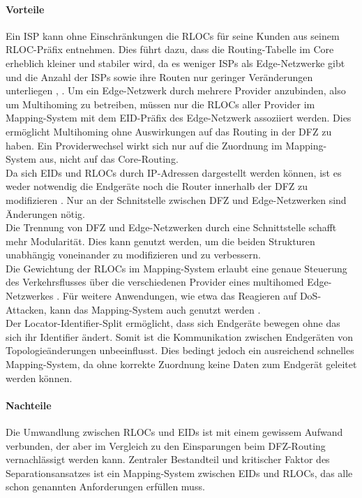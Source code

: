\paragraph{Vorteile}
Ein ISP kann ohne Einschränkungen die RLOCs für seine Kunden aus seinem RLOC-Präfix entnehmen. Dies führt dazu, dass die Routing-Tabelle im Core erheblich kleiner und stabiler wird, da es weniger ISPs als Edge-Netzwerke gibt und die Anzahl der ISPs sowie ihre Routen nur geringer Veränderungen unterliegen \cite{jen:2008:start}, \cite{deering:1996:map}.
Um ein Edge-Netzwerk durch mehrere Provider anzubinden, also um Multihoming zu betreiben, müssen nur die RLOCs aller Provider im Mapping-System mit dem EID-Präfix des Edge-Netzwerk assoziiert werden\cite{farinacci:2009:LISP}. Dies ermöglicht Multihoming ohne Auswirkungen auf das Routing in der DFZ zu haben. Ein Providerwechsel wirkt sich nur auf die Zuordnung im  Mapping-System aus, nicht auf das Core-Routing. \\
Da sich EIDs und RLOCs durch IP-Adressen dargestellt werden können, ist es weder notwendig die Endgeräte noch die Router innerhalb der DFZ zu modifizieren \cite{jen:2008:start}. Nur an der Schnitstelle zwischen DFZ und Edge-Netzwerken sind Änderungen nötig. \\
Die Trennung von DFZ und Edge-Netzwerken durch eine Schnittstelle schafft mehr Modularität. Dies kann genutzt werden, um die beiden Strukturen unabhängig voneinander zu modifizieren und zu verbessern. \\ %
Die Gewichtung der RLOCs im Mapping-System erlaubt eine genaue Steuerung des Verkehrsflusses über die verschiedenen Provider eines multihomed Edge-Netzwerkes \cite{mathy:2008:dht}. Für weitere Anwendungen, wie etwa das Reagieren auf DoS-Attacken, kann das Mapping-System auch genutzt werden \cite{jen:2008:start}. \\
Der Locator-Identifier-Split ermöglicht, dass sich Endgeräte bewegen ohne das sich ihr Identifier ändert. Somit ist die Kommunikation zwischen Endgeräten von Topologieänderungen unbeeinflusst. Dies bedingt jedoch ein ausreichend schnelles Mapping-System, da ohne korrekte Zuordnung keine Daten zum Endgerät geleitet werden können.

\paragraph{Nachteile}
Die Umwandlung zwischen RLOCs und EIDs ist mit einem gewissem Aufwand verbunden, der aber im Vergleich zu den Einsparungen beim DFZ-Routing vernachlässigt werden kann. Zentraler Bestandteil und kritischer Faktor des Separationsansatzes ist ein Mapping-System zwischen EIDs und RLOCs, das alle schon genannten Anforderungen erfüllen muss. 


